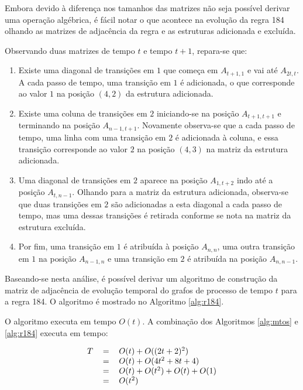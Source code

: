 \documentclass[12pt,a4paper]{article}
\begin{document}
Embora devido à diferença nos tamanhos das matrizes não seja possível
derivar uma operação algébrica, é fácil notar o que acontece na evolução
da regra 184 olhando as matrizes de adjacência da regra e as estruturas
adicionada e excluída.

Observando duas matrizes de tempo $t$ e tempo $t+1$, repara-se que:

\begin{enumerate}
\item Existe uma diagonal de transições em $1$ que começa em $A_{t+1,1}$
e vai até $A_{2t,t}$. A cada passo de tempo, uma transição em $1$ é adicionada,
o que corresponde ao valor $1$ na posição $(4,2)$ da estrutura adicionada.

\item Existe uma coluna de transições em $2$ iniciando-se na posição
$A_{t+1,t+1}$ e terminando na posição $A_{n-1,t+1}$. Novamente observa-se
que a cada passo de tempo, uma linha com uma transição em $2$ é adicionada à
coluna, e essa transição corresponde ao valor $2$ na posição $(4,3)$ na matriz da
estrutura adicionada.

\item Uma diagonal de transições em $2$ aparece na posição $A_{1,t+2}$ indo
até a posição $A_{t,n-1}$. Olhando para a matriz da estrutura adicionada,
observa-se que duas transições em $2$ são adicionadas a esta diagonal a cada
passo de tempo, mas uma dessas transições é retirada conforme se nota na
matriz da estrutura excluída.

\item Por fim, uma transição em $1$ é atribuída à posição $A_{n,n}$, uma
outra transição em $1$ na posição $A_{n-1,n}$ e uma transição em $2$ é
atribuída na posição $A_{n,n-1}$.
\end{enumerate}

Baseando-se nesta análise, é possível derivar um algoritmo de construção da
matriz de adjacência de evolução temporal do grafos de processo de tempo $t$ para a
regra 184. O algoritmo é mostrado no Algoritmo \ref{alg:r184}.

O algoritmo executa em tempo $O(t)$. A combinação dos Algoritmos
\ref{alg:mtos} e \ref{alg:r184} executa em tempo:

\begin{equation}
\begin{tabular}{ r c l }
\(T\) & \(=\) & \(O(t) + O((2t+2)^2)\) \\
  & \(=\) & \(O(t) + O(4t^2+8t+4)\) \\
  & \(=\) & \(O(t) + O(t^2) + O(t) + O(1)\) \\
  & \(=\) & \(O(t^2)\)
\end{tabular}
\end{equation}
\end{document}
